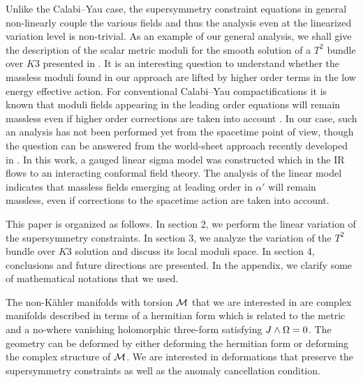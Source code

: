 Unlike the Calabi--Yau case, the supersymmetry constraint
equations in general non-linearly couple the various fields and
thus the analysis even at the linearized variation level is
non-trivial. As an example of our general analysis, we shall give
the description of the scalar metric moduli for the smooth
solution of a $T^2$ bundle over $K3$ presented in . It is an interesting question to understand whether the
massless moduli found in our approach are lifted by higher order
terms in the low energy effective action. For conventional
Calabi--Yau compactifications it is known that moduli fields
appearing in the leading order equations will remain massless even
if higher order corrections are taken into account . In our case, such an analysis has not been performed yet
from the spacetime point of view, though the question can be
answered from the world-sheet approach recently developed in
. In this work, a gauged linear sigma model was
constructed which in the IR flows to an interacting conformal
field theory. The analysis of the linear model indicates that
massless fields emerging at leading order in $\alpha'$ will remain
massless, even if corrections to the spacetime action are taken
into account.



This paper is organized as follows. In section 2, we perform the
linear variation of the supersymmetry constraints.  In section 3,
we analyze the variation of the $T^2$ bundle over $K3$ solution
and discuss its local moduli space. In section 4, conclusions and
future directions are presented. In the appendix, we clarify some
of mathematical notations that we used.







The non-K\"ahler manifolds with torsion ${\cal M}$ that we are
interested in are complex manifolds described in terms of a
hermitian form which is related to the metric
\eqn{} 
and a no-where vanishing holomorphic three-form
\eqn{}
satisfying $J\wedge \Omega =0$.  The geometry can be deformed by either 
deforming the hermitian form or
deforming the complex structure of ${\cal M}$. We are interested
in deformations that preserve the supersymmetry constraints as
well as the anomaly cancellation condition.




